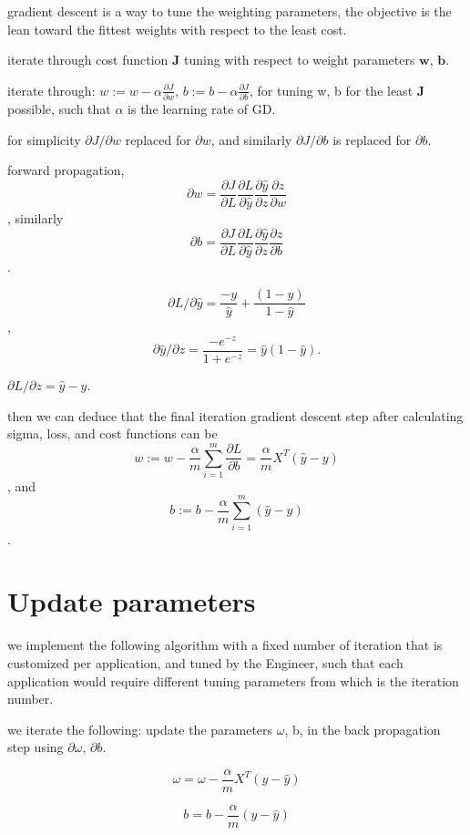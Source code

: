 \documentclass[4apaper,12pt]{book}
\begin{document}
  \begin{description}

  \item gradient descent is a way to tune the weighting parameters, the objective is the lean toward the fittest weights with respect to the least cost.
  \item iterate through cost function $\mathbf{J}$ tuning with respect to weight parameters  $\mathbf{w}$, $\mathbf{b}$.
  \item iterate through: $w:=w-\alpha\frac{\partial{J}}{\partial{w}}$,  $b:=b-\alpha\frac{\partial{J}}{\partial{b}}$, for tuning w, b for the least $\mathbf{J}$ possible, such that $\alpha$ is the learning rate of GD.
  \item for simplicity $\partial{J}/\partial{w}$ replaced for $\partial{w}$, and similarly $\partial{J}/\partial{b}$ is replaced for $\partial{b}$.
  \item forward propagation, $$\partial w = \frac{\partial{J}}{\partial{L}}\frac{\partial{L}}{\partial{\hat{y}}}\frac{\partial{\hat{y}}}{\partial{z}}\frac{\partial{z}}{\partial{w}}$$, similarly $$\partial b = \frac{\partial{J}}{\partial{L}}\frac{\partial{L}}{\partial{\hat{y}}}\frac{\partial{\hat{y}}}{\partial{z}}\frac{\partial{z}}{\partial{b}}$$.
  \item $$\partial{L}/\partial{\hat{y}}=\frac{-y}{\hat{y}} + \frac{(1-y)}{1-\hat{y}}$$, $$\partial{\hat{y}}/\partial{z}=\frac{-e^{-z}}{1+e^{-z}} = \hat{y}(1-\hat{y}).$$
  \item $\partial{L}/\partial{z}=\hat{y}-y$.
  \item then we can deduce that the final iteration gradient descent step after calculating sigma, loss, and cost functions can be  $$w:=w-\frac{\alpha}{m}\sum_{i=1}^m\frac{\partial{L}}{\partial{b}}=\frac{\alpha}{m}X^T(\hat{y}-y)$$, and $$b:=b-\frac{\alpha}{m}\sum_{i=1}^{m}(\hat{y}-y)$$.
  \end{description}


  \section{Update parameters}
  \begin{description}
  \item we implement the following algorithm with a fixed number of iteration that is customized per application, and tuned by the Engineer, such that each application would require different tuning parameters from which is the iteration number.
  \item we iterate the following: update the parameters $\omega$, b, in the back propagation step using $\partial{\omega}$, $\partial{b}$.
  \item $$\omega = \omega - \frac{\alpha}{m}X^T(y-\hat{y})$$
  \item $$b = b - \frac{\alpha}{m}(y-\hat{y})$$
  \end{description}
\end{document}
